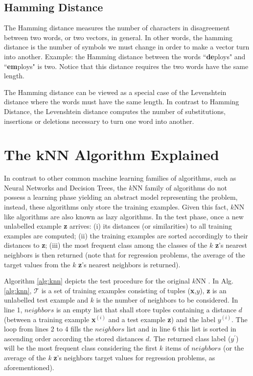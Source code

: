 \subsection{Hamming Distance}

The Hamming distance \cite{hamming:12} measures the number of characters in disagreement between two words, or two vectors, in general. In other words, the hamming distance is the number of symbols we must change in order to make a vector turn into another. Example: the Hamming distance between the words ``\textbf{de}ploys" and ``\textbf{em}ploys" is two. Notice that this distance requires the two words have the same length. 

The Hamming distance can be viewed as a special case of the Levenshtein distance where the words must have the same length. In contrast to Hamming Distance, the Levenshtein distance computes the number of substitutions, insertions or deletions necessary to turn one word into another.


\section{The kNN Algorithm Explained}

In contrast to other common machine learning families of algorithms, such as Neural Networks and Decision Trees, the $k$NN family of algorithms do not possess a learning phase yielding an abstract model representing the problem, instead, these algorithms only store the training examples. Given this fact, $k$NN like algorithms are also known as lazy algorithms. In the test phase, once a new unlabelled example \textbf{z} arrives: (i) its distances (or similarities) to all training examples are computed; (ii) the training examples are sorted accordingly to their distances to \textbf{z}; (iii) the most frequent class among the classes of the $k$ \textbf{z}'s nearest neighbors is then returned (note that for regression problems, the average of the target values from the $k$ \textbf{z}'s nearest neighbors is returned). 

Algorithm \ref{alg:knn} depicts the test procedure for the original $k$NN . In Alg. \ref{alg:knn}, $\mathcal{T}$ is a set of training examples consisting of tuples (\textbf{x},$y$), \textbf{z} is an unlabelled test example and $k$ is the number of neighbors to be considered. In line 1, $neighbors$ is an empty list that shall store tuples containing a distance $d$ (between a training example \textbf{x}$^{(i)}$ and a test example \textbf{z}) and the label $y^{(i)}$. The loop from lines 2 to 4 fills the $neighbors$ list and in line 6 this list is sorted in ascending order according the stored distances $d$. The returned class label ($y^{'}$) will be the most frequent class considering the first $k$ items of $neighbors$ (or the average of the \textit{k} \textbf{z}'s neighbors target values for regression problems, as aforementioned).

